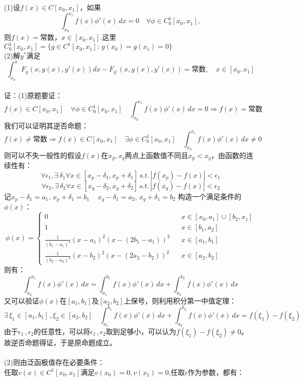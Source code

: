 \documentclass{article}
\begin{document}
\begin{itemize}
		(1)设$f(x)\in C[x_0, x_1]$，如果
		$$\int_{x_0}^{x_{1}}f(x)\phi'(x)\,dx = 0 \quad \forall \phi \in C^{1}_{0}[x_{0}, x_{1}],$$
		则$f(x) = $常数，$x \in [x_0, x_1].$这里$C_{0}^{1}[x_0, x_1] = \{g\in C^1[x_0, x_1]:\, g(x_0) = g(x_1) = 0\}$\\
		(2)解$y^*$满足
		$$\int_{x_0}^{x}F_{y}(x, y(x), y'(x))dx - F_{y'}(x, y(x), y'(x))=\mbox{常数},\quad x\in[x_0, x_1]$$\\
		证：(1)原题要证：
		$$f(x)\in C[x_0, x_1] \quad \forall \phi \in C^{1}_{0}[x_{0}, x_{1}] \quad \int_{x_0}^{x_{1}}f(x)\phi'(x)\,dx = 0 \Rightarrow f(x) =\mbox{常数}$$
		我们可以证明其逆否命题：
		$$f(x) \ne \mbox{常数} \Rightarrow f(x)\in C[x_0, x_1] \quad \exists \phi \in C^{1}_{0}[x_{0}, x_{1}] \quad \int_{x_0}^{x_{1}}f(x)\phi'(x)\,dx \ne 0$$
		则可以不失一般性的假设$f(x)$在$x_p, x_q$两点上函数值不同且$x_p<x_q$，由函数的连续性有：\\
		$$\forall \epsilon_1, \exists\, \delta_1 \forall x \in[x_p - \delta_1,  x_p + \delta_1]\, s.t.\,|f(x_p) - f(x)| < \epsilon_1$$
		$$\forall \epsilon_2, \exists\, \delta_2 \forall x \in[x_q - \delta_2,  x_q + \delta_2]\, s.t.\,|f(x_q) - f(x)| < \epsilon_2$$
		记$x_p - \delta_1 = a_1, \, x_p + \delta_1 = b_1\, \quad x_q - \delta_1 = a_2, \, x_q + \delta_1 = b_2$
		构造一个满足条件的$\phi(x)$：
		$$
		\phi(x) = \left\{
		\begin{array}{lcl}
		0 && x\in [x_0, a_1] \cup [b_2, x_1]\\
		1 && x\in [b_1, a_2]\\
		\frac{1}{(b_1 -a_1)^4}(x -a_1)^2(x - (2b_1 - a_1))^2 && x\in [a_1, b_1]\\
		\frac{1}{(b_2 -a_2)^4}(x -b_2)^2(x - (2a_2 - b_2))^2 && x\in [a_2, b_2] 
		\end{array}
		\right.$$
		则有：
		$$\int_{x_0}^{x_{1}}f(x)\phi'(x)\,dx = \int_{a_1}^{b_1}f(x)\phi'(x)\,dx + \int_{a_2}^{b_2}f(x)\phi'(x)\,dx$$
		又可以验证$\phi(x)$在$[a_1, b_1]$及$[a_2, b_2]$上保号，则利用积分第一中值定理：
		$$\exists\, \xi_1\in [a_1, b_1]\,, \xi_2 \in [a_2, b_2]\quad  \int_{a_1}^{b_1}f(x)\phi'(x)\,dx + \int_{a_2}^{b_2}f(x)\phi'(x)\,dx = f(\xi_1) - f(\xi_2)$$
		由于$\epsilon_1\, ,\epsilon_2$的任意性，可以将$\epsilon_1\, ,\epsilon_2$取到足够小，可以认为$f(\xi_1) - f(\xi_2)\ne 0$。\\
		故逆否命题得证，于是原命题成立。\\\\
		(2)则由泛函极值存在必要条件：\\
		任取$v(x)\in C^1[x_0,x_1]$满足$ v(x_0) = 0, v(x_1) = 0$,任取$\epsilon$作为参数，都有：

\end{itemize}
\end{document}
